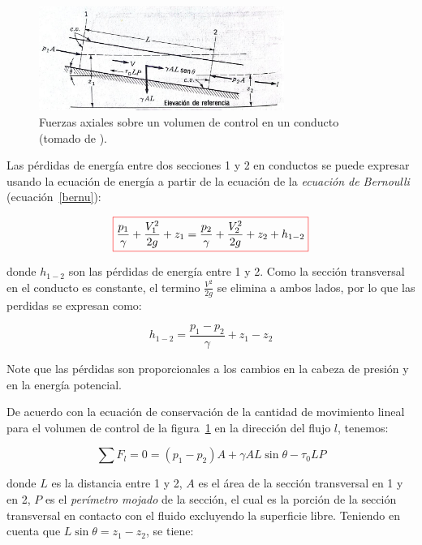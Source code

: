 \documentclass[11pt, oneside]{article}
\begin{document}
\begin{figure}[h]
\centering
\includegraphics[width=8cm]{perd.jpeg}
\caption{Fuerzas axiales sobre un volumen de control en un conducto (tomado de \cite{streeter}).}
\label{perd}
\end{figure}

Las p\'erdidas de energ\'ia entre dos secciones 1 y 2 en conductos se puede expresar usando la ecuaci\'on de energ\'ia a partir de la ecuaci\'on de la \emph{ecuaci\'on de Bernoulli} (ecuaci\'on~\ref{bernu}):

\begin{equation}
\color{red}\boxed{\color{black} \frac{p_1}{\gamma} + \frac{V_1^2}{2g} + z_1 = \frac{p_2}{\gamma} + \frac{V_2^2}{2g} + z_2 + h_{1-2}  }
\label{perd1}
\end{equation}

donde $h_{1-2}$ son las p\'erdidas de energ\'ia entre 1 y 2. Como la secci\'on transversal en el conducto es constante, el termino $\frac{V^2}{2g}$ se elimina a ambos lados, por lo que las perdidas se expresan como:
 
\begin{equation}
h_{1-2} = \frac{p_1 - p_2}{\gamma} + z_1 - z_2
\label{perd2}
\end{equation}

Note que las p\'erdidas son proporcionales a los cambios en la cabeza de presi\'on y en la energ\'ia potencial.

De acuerdo con la ecuaci\'on de conservaci\'on de la cantidad de movimiento lineal para  el volumen de control de la  figura~\ref{perd} en la direcci\'on del flujo $l$, tenemos:

\begin{equation}
\sum F_l = 0 = (p_1 - p_2)A + \gamma AL \sin \theta - \tau_0 L P
\label{perd3}
\end{equation}

donde $L$ es la distancia entre 1 y 2, $A$ es el \'area de la secci\'on transversal en 1 y en 2, $P$ es el \emph{per\'imetro mojado} de la secci\'on, el cual es la porci\'on de la secci\'on transversal en contacto con el fluido excluyendo la superficie libre. Teniendo en cuenta que $L\sin \theta = z_1 - z_2$, se tiene:
 
\end{document}
